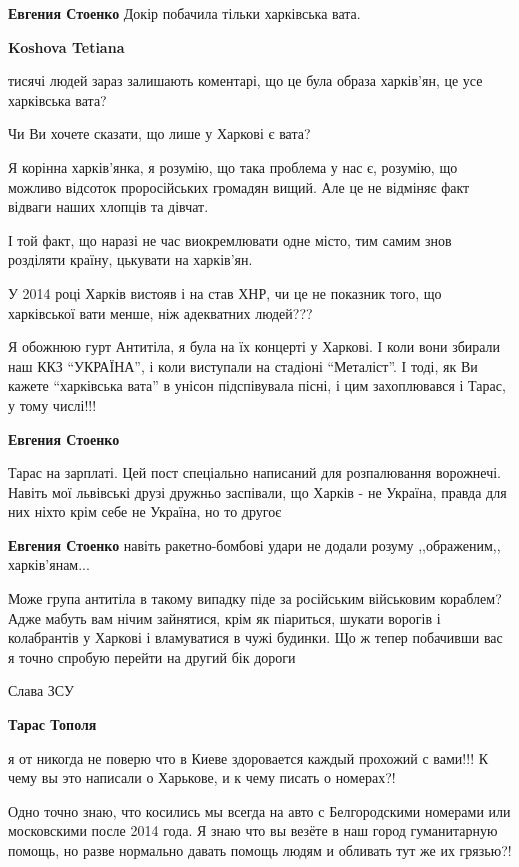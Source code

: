 \begin{itemize}
\begin{itemize}
\textbf{Евгения Стоенко} Докір побачила тільки харківська вата.

\textbf{Koshova Tetiana} 

тисячі людей зараз залишають коментарі, що це була образа харків'ян, це усе
харківська вата?

Чи Ви хочете сказати, що лише у Харкові є вата?

Я корінна харків'янка, я розумію, що така проблема у нас є, розумію, що можливо
відсоток проросійських громадян вищий. Але це не відміняє факт відваги наших
хлопців та дівчат.

І той факт, що наразі не час виокремлювати одне місто, тим самим знов розділяти
країну, цькувати на харків'ян.

У 2014 році Харків вистояв і на став ХНР, чи це не показник того, що
харківської вати менше, ніж адекватних людей???

Я обожнюю гурт Антитіла, я була на їх концерті у Харкові. І коли вони збирали
наш ККЗ \enquote{УКРАЇНА}, і коли виступали на стадіоні \enquote{Металіст}. І тоді, як Ви
кажете \enquote{харківська вата} в унісон підспівувала пісні, і цим захоплювався і
Тарас, у тому числі!!!

\textbf{Евгения Стоенко} 

Тарас на зарплаті. Цей пост спеціально написаний для розпалювання ворожнечі.
Навіть мої львівські друзі дружньо заспівали, що Харків - не Україна, правда
для них ніхто крім себе не Україна, но то другоє

\textbf{Евгения Стоенко} навіть ракетно-бомбові удари не додали розуму ,,ображеним,, харків'янам...


Може група антитіла в такому випадку піде за російським військовим кораблем?
Адже мабуть вам нічим зайнятися, крім як піариться, шукати ворогів і
колабрантів у Харкові і вламуватися в чужі будинки. Що ж тепер побачивши вас я
точно спробую перейти на другий бік дороги

Слава ЗСУ

\textbf{Тарас Тополя} 

я от никогда не поверю что в Киеве здоровается каждый прохожий с вами!!! К чему
вы это написали о Харькове, и к чему писать о номерах?!

Одно точно знаю, что косились мы всегда на авто с Белгородскими номерами или
московскими после 2014 года. Я знаю что вы везёте в наш город гуманитарную
помощь, но разве нормально давать помощь людям и обливать тут же их грязью?!


\end{itemize}
\end{itemize}
